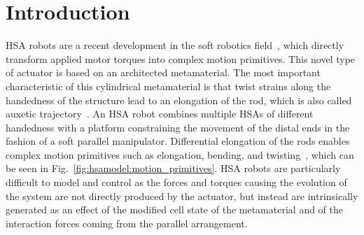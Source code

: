 \section{Introduction}\label{sec:hsamodel:introduction}


\gls{HSA} robots are a recent development in the soft robotics field~\cite{chin2018compliant, truby2021recipe, zhang2022vision}, which directly transform applied motor torques into complex motion primitives. %
%
This novel type of actuator is based on an architected metamaterial. The most important characteristic of this cylindrical metamaterial is that twist strains along the handedness of the structure lead to an elongation of the rod, which is also called auxetic trajectory~\cite{good2022expanding}. 
An \gls{HSA} robot combines multiple \glspl{HSA} of different handedness with a platform constraining the movement of the distal ends in the fashion of a soft parallel manipulator. 
Differential elongation of the rods enables complex motion primitives such as elongation, bending, and twisting~\cite{chin2018compliant}, which can be seen in Fig.~\ref{fig:hsamodel:motion_primitives}. %
\gls{HSA} robots are particularly difficult to model and control as the forces and torques causing the evolution of the system are not directly produced by the actuator, but instead are intrinsically generated as an effect of the modified cell state of the metamaterial and of the interaction forces coming from the parallel arrangement.

